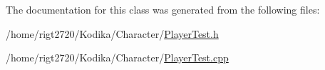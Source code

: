 The documentation for this class was generated from the following files\-:\begin{DoxyCompactItemize}
\item 
/home/rigt2720/\-Kodika/\-Character/\hyperlink{PlayerTest_8h}{Player\-Test.\-h}\item 
/home/rigt2720/\-Kodika/\-Character/\hyperlink{PlayerTest_8cpp}{Player\-Test.\-cpp}\end{DoxyCompactItemize}
